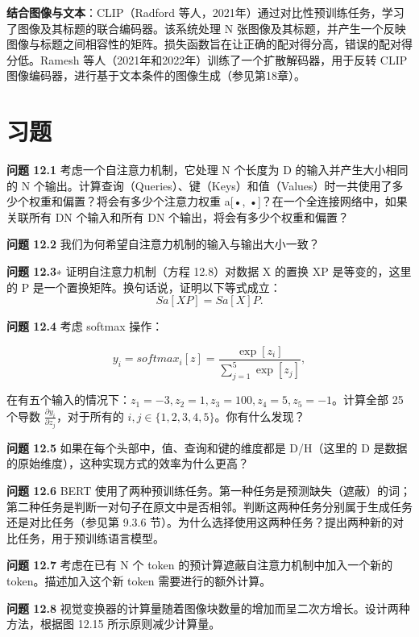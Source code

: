 \documentclass[lang=cn,newtx,10pt,scheme=chinese]{elegantbook}
\begin{document}
\textbf{结合图像与文本}：CLIP（Radford 等人，2021年）通过对比性预训练任务，学习了图像及其标题的联合编码器。该系统处理 N 张图像及其标题，并产生一个反映图像与标题之间相容性的矩阵。损失函数旨在让正确的配对得分高，错误的配对得分低。Ramesh 等人（2021年和2022年）训练了一个扩散解码器，用于反转 CLIP 图像编码器，进行基于文本条件的图像生成（参见第18章）。


\section{习题}
\textbf{问题 12.1} 考虑一个自注意力机制，它处理 N 个长度为 D 的输入并产生大小相同的 N 个输出。计算查询（Queries）、键（Keys）和值（Values）时一共使用了多少个权重和偏置？将会有多少个注意力权重 a[•, •]？在一个全连接网络中，如果关联所有 DN 个输入和所有 DN 个输出，将会有多少个权重和偏置？

\textbf{问题 12.2} 我们为何希望自注意力机制的输入与输出大小一致？

\textbf{问题 12.3}∗ 证明自注意力机制（方程 12.8）对数据 X 的置换 XP 是等变的，这里的 P 是一个置换矩阵。换句话说，证明以下等式成立：
\begin{equation}
Sa[XP] = Sa[X]P. 
\end{equation}

\textbf{问题 12.4} 考虑 softmax 操作：

\begin{equation}
y_i = softmax_i[z] = \frac{\exp[z_i]}{\sum_{j=1}^{5} \exp[z_j]}, 
\end{equation}

在有五个输入的情况下：\(z_1 = -3, z_2 = 1, z_3 = 100, z_4 = 5, z_5 = -1\)。计算全部 25 个导数 \(\frac{\partial y_i}{\partial z_j}\)，对于所有的 \(i,j \in \{1,2,3,4,5\}\)。你有什么发现？

\textbf{问题 12.5} 如果在每个头部中，值、查询和键的维度都是 D/H（这里的 D 是数据的原始维度），这种实现方式的效率为什么更高？

\textbf{问题 12.6} BERT 使用了两种预训练任务。第一种任务是预测缺失（遮蔽）的词；第二种任务是判断一对句子在原文中是否相邻。判断这两种任务分别属于生成任务还是对比任务（参见第 9.3.6 节）。为什么选择使用这两种任务？提出两种新的对比任务，用于预训练语言模型。

\textbf{问题 12.7} 考虑在已有 N 个 token 的预计算遮蔽自注意力机制中加入一个新的 token。描述加入这个新 token 需要进行的额外计算。

\textbf{问题 12.8} 视觉变换器的计算量随着图像块数量的增加而呈二次方增长。设计两种方法，根据图 12.15 所示原则减少计算量。
\end{document}
